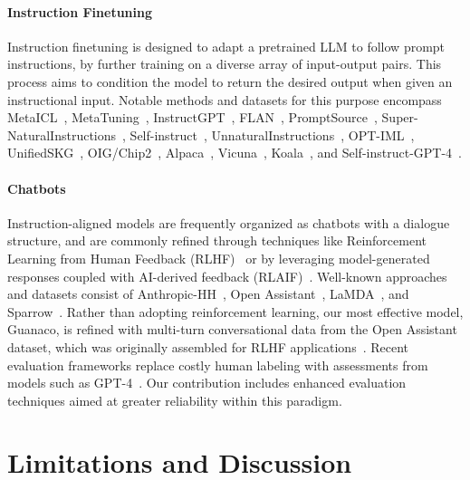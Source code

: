 \paragraph{Instruction Finetuning} Instruction finetuning is designed to adapt a pretrained LLM to follow prompt instructions, by further training on a diverse array of input-output pairs. This process aims to condition the model to return the desired output when given an instructional input. Notable methods and datasets for this purpose encompass MetaICL~\citep{min2021metaicl}, MetaTuning~\citep{zhong2021adapting}, InstructGPT~\citep{ouyang2022training}, FLAN~\citep{wei2021finetuned,chung2022scaling}, PromptSource~\citep{bach2022promptsource}, Super-NaturalInstructions~\citep{wang2022super,sanh2021multitask}, Self-instruct~\citep{wang2022self}, UnnaturalInstructions~\citep{honovich2022unnatural}, OPT-IML~\citep{iyer2022opt}, UnifiedSKG~\citep{xie2022unifiedskg}, OIG/Chip2~\citep{laion2023}, Alpaca~\citep{alpaca}, Vicuna~\citep{vicuna2023}, Koala~\citep{koala_blogpost_2023}, and Self-instruct-GPT-4~\citep{peng2023instruction}.

\paragraph{Chatbots} Instruction-aligned models are frequently organized as chatbots with a dialogue structure, and are commonly refined through techniques like Reinforcement Learning from Human Feedback (RLHF)~\citep{christiano2017deep} or by leveraging model-generated responses coupled with AI-derived feedback (RLAIF)~\citep{bai2022constitutional}. Well-known approaches and datasets consist of Anthropic-HH~\citep{askell2021general,bai2022training}, Open Assistant~\citep{kopf2023openassistant}, LaMDA~\citep{thoppilan2022lamda}, and Sparrow~\citep{glaese2022improving}. Rather than adopting reinforcement learning, our most effective model, Guanaco, is refined with multi-turn conversational data from the Open Assistant dataset, which was originally assembled for RLHF applications~\citep{kopf2023openassistant}. Recent evaluation frameworks replace costly human labeling with assessments from models such as GPT-4~\citep{vicuna2023,peng2023instruction}. Our contribution includes enhanced evaluation techniques aimed at greater reliability within this paradigm.

\section{Limitations and Discussion}

